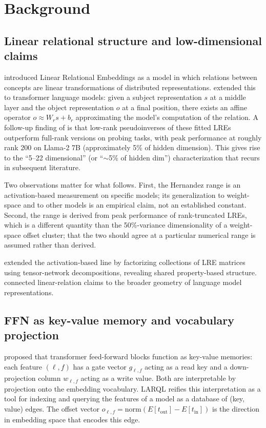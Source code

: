 \documentclass[11pt,letterpaper]{article}
\begin{document}
\section{Background}
\label{sec:background}

\subsection{Linear relational structure and low-dimensional claims}

\citet{paccanaro2001learning} introduced Linear Relational Embeddings as a model in which relations between concepts are linear transformations of distributed representations. \citet{hernandez2024linearity} extended this to transformer language models: given a subject representation $s$ at a middle layer and the object representation $o$ at a final position, there exists an affine operator $o \approx W_r s + b_r$ approximating the model's computation of the relation. A follow-up finding of \citet{chanin2023identifying} is that low-rank pseudoinverses of these fitted LREs outperform full-rank versions on probing tasks, with peak performance at roughly rank 200 on Llama-2 7B (approximately 5\% of hidden dimension). This gives rise to the ``5--22 dimensional'' (or ``$\sim$5\% of hidden dim'') characterization that recurs in subsequent literature.

Two observations matter for what follows. First, the Hernandez range is an activation-based measurement on specific models; its generalization to weight-space and to other models is an empirical claim, not an established constant. Second, the range is derived from peak performance of rank-truncated LREs, which is a different quantity than the 50\%-variance dimensionality of a weight-space offset cluster; that the two should agree at a particular numerical range is assumed rather than derived.

\citet{csiszarik2025structure} extended the activation-based line by factorizing collections of LRE matrices using tensor-network decompositions, revealing shared property-based structure. \citet{park2024linear} connected linear-relation claims to the broader geometry of language model representations.

\subsection{FFN as key-value memory and vocabulary projection}

\citet{geva2021transformer, geva2022transformer} proposed that transformer feed-forward blocks function as key-value memories: each feature $(\ell, f)$ has a gate vector $g_{\ell,f}$ acting as a read key and a down-projection column $w_{\ell,f}$ acting as a write value. Both are interpretable by projection onto the embedding vocabulary. LARQL \citep{hayuk2026} reifies this interpretation as a tool for indexing and querying the features of a model as a database of (key, value) edges. The offset vector $o_{\ell,f} = \mathrm{norm}(E[t_{\mathrm{out}}] - E[t_{\mathrm{in}}])$ is the direction in embedding space that encodes this edge.
\end{document}

